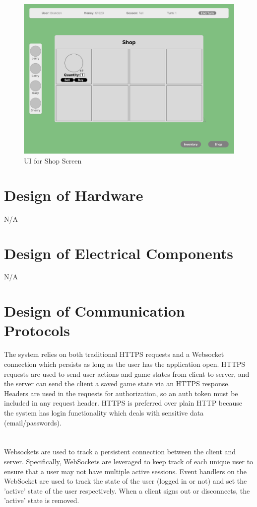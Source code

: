 \documentclass[12pt, titlepage]{article}
\begin{document}
\begin{figure}[H]
\centering
\includegraphics[width=1\textwidth]{shop.png}
\caption{UI for Shop Screen}
\label{FigUH}
\end{figure}

\section{Design of Hardware}
N/A

\section{Design of Electrical Components}
N/A

\section{Design of Communication Protocols}
The system relies on both traditional HTTPS requests and a Websocket connection which persists as long as the user has the application open. HTTPS requests are used to send user actions and game states from client to server, and the server can send the client a saved game state via an HTTPS response. Headers are used in the requests for authorization, so an auth token must be included in any request header. HTTPS is preferred over plain HTTP because the system has login functionality which deals with sensitive data (email/passwords).\\
\\
\\ Websockets are used to track a persistent connection between the client and server. Specifically, WebSockets are leveraged to keep track of each unique user to ensure that a user may not have multiple active sessions. Event handlers on the WebSocket are used to track the state of the user (logged in or not) and set the 'active' state of the user respectively. When a client signs out or disconnects, the 'active' state is removed. 
\end{document}
